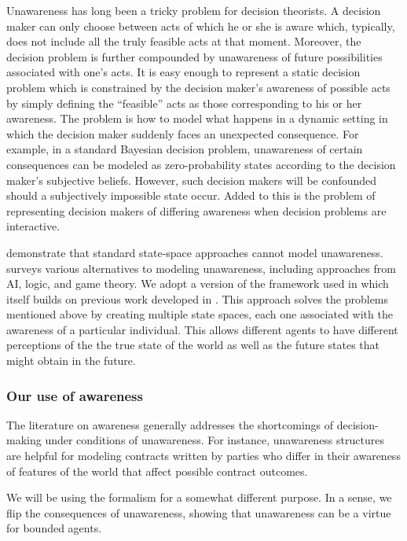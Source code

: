 \documentclass[
11pt,
titlepage,
reqno,
]{article}%
\theoremstyle{definition}
\begin{document}
Unawareness has long been a tricky problem for decision theorists. 
A decision maker can only choose between acts of which he or she is aware which, typically, does not include all the truly feasible acts at that moment. 
Moreover, the decision problem is further compounded by unawareness of future possibilities associated with one's acts. 
It is easy enough to represent a static decision problem which is constrained by the decision maker's awareness of possible acts by simply  defining the ``feasible'' acts as those corresponding to his or her awareness.
The problem is how to model what happens in a dynamic setting in which the decision maker suddenly faces an unexpected consequence. 
For example, in a standard Bayesian decision problem, unawareness of certain consequences can be modeled as zero-probability states according to the decision maker's subjective beliefs. 
However, such decision makers will be confounded should a subjectively impossible state occur. 
Added to this is the problem of representing decision makers of differing awareness when decision problems are interactive. 

\citet{Dekel1998} demonstrate that standard state-space approaches cannot model unawareness. 
\citet{Schipper2015} surveys various alternatives to modeling unawareness, including approaches from  AI, logic, and game theory. 
We adopt a version of the framework used in   \cite{bryan2020value} which itself builds on previous work developed in \citet{Heifetz2006} \citep[also see][for related extensions]{Heifetz2008,Heifetz2013}. 
This approach solves the problems mentioned above by creating multiple state spaces, each one associated with the awareness of a particular individual. 
This allows different agents to have different perceptions of the the true state of the world as well as the future states that might obtain in the future. 

\subsubsection{Our use of awareness}
The literature on awareness generally addresses the shortcomings of decision-making under conditions of unawareness. For instance, unawareness structures are helpful for modeling contracts written by parties who differ in their awareness of features of the world that affect possible contract outcomes.

We will be using the formalism for a somewhat different purpose. In a sense, we flip the consequences of unawareness, showing that unawareness can be a virtue for bounded agents. 
\end{document}
